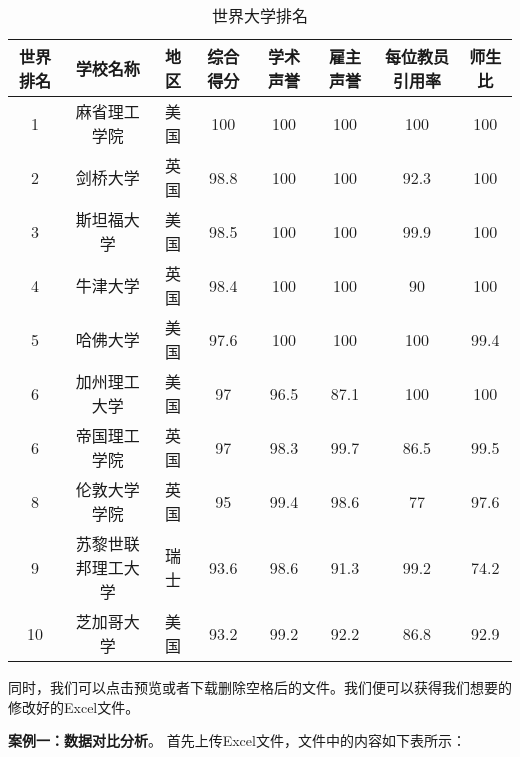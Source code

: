 \begin{table}[h]
    \centering
    \footnotesize
    \begin{tabular}{cccccccc}
        \toprule
        世界排名 & 学校名称 & 地区 & 综合得分 & 学术声誉 & 雇主声誉 & 每位教员引用率 & 师生比 \\
        \midrule
        1  & 麻省理工学院     & 美国 & 100  & 100  & 100  & 100  & 100  \\
        2  & 剑桥大学         & 英国 & 98.8 & 100  & 100  & 92.3 & 100  \\
        3  & 斯坦福大学       & 美国 & 98.5 & 100  & 100  & 99.9 & 100  \\
        4  & 牛津大学         & 英国 & 98.4 & 100  & 100  & 90   & 100  \\
        5  & 哈佛大学         & 美国 & 97.6 & 100  & 100  & 100  & 99.4 \\
        6  & 加州理工大学     & 美国 & 97   & 96.5 & 87.1 & 100  & 100  \\
        6  & 帝国理工学院     & 英国 & 97   & 98.3 & 99.7 & 86.5 & 99.5 \\
        8  & 伦敦大学学院     & 英国 & 95   & 99.4 & 98.6 & 77   & 97.6 \\
        9  & 苏黎世联邦理工大学 & 瑞士 & 93.6 & 98.6 & 91.3 & 99.2 & 74.2 \\
        10 & 芝加哥大学       & 美国 & 93.2 & 99.2 & 92.2 & 86.8 & 92.9 \\
        \bottomrule
    \end{tabular}
    \caption{世界大学排名}
    \label{tab:world_ranking2}
\end{table}
\FloatBarrier
同时，我们可以点击预览或者下载删除空格后的文件。我们便可以获得我们想要的修改好的Excel文件。


\textbf{案例一：数据对比分析}。
首先上传Excel文件，文件中的内容如下表所示：

